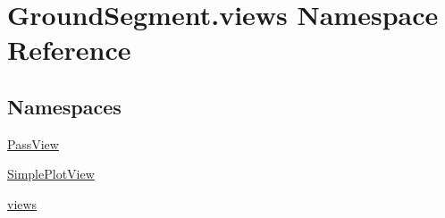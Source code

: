 \hypertarget{namespace_ground_segment_1_1views}{}\section{Ground\+Segment.\+views Namespace Reference}
\label{namespace_ground_segment_1_1views}
\subsection*{Namespaces}
\begin{DoxyCompactItemize}
\item 
 \hyperlink{namespace_ground_segment_1_1views_1_1_pass_view}{Pass\+View}
\item 
 \hyperlink{namespace_ground_segment_1_1views_1_1_simple_plot_view}{Simple\+Plot\+View}
\item 
 \hyperlink{namespace_ground_segment_1_1views_1_1views}{views}
\end{DoxyCompactItemize}
